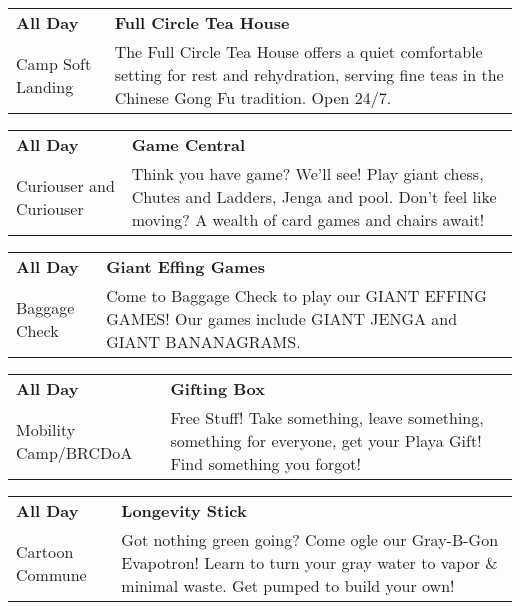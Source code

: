 \begin{tabular}{ p{1in} p{2.2in} }
    \textbf{All Day} & \textbf{Full Circle Tea House} \\
    Camp Soft Landing \newline  & The Full Circle Tea House offers a quiet comfortable setting for rest and rehydration, serving fine teas in the Chinese Gong Fu tradition. Open 24/7. \\
    \hline 
\end{tabular}
    
\begin{tabular}{ p{1in} p{2.2in} }
    \textbf{All Day} & \textbf{Game Central} \\
    Curiouser and Curiouser \newline  & Think you have game? We'll see! Play giant chess, Chutes and Ladders, Jenga and pool. Don't feel like moving? A wealth of card games and chairs await! \\
    \hline 
\end{tabular}
    
\begin{tabular}{ p{1in} p{2.2in} }
    \textbf{All Day} & \textbf{Giant Effing Games} \\
    Baggage Check \newline  & Come to Baggage Check to play our GIANT EFFING GAMES! Our games include GIANT JENGA and GIANT BANANAGRAMS. \\
    \hline 
\end{tabular}
    
\begin{tabular}{ p{1in} p{2.2in} }
    \textbf{All Day} & \textbf{Gifting Box} \\
    Mobility Camp/BRCDoA \newline  & Free Stuff! Take something, leave something, something for everyone, get your Playa Gift! Find something you forgot! \\
    \hline 
\end{tabular}
    
\begin{tabular}{ p{1in} p{2.2in} }
    \textbf{All Day} & \textbf{Longevity Stick} \\
    Cartoon Commune \newline  & Got nothing green going? Come ogle our Gray-B-Gon Evapotron! Learn to turn your gray water to vapor \& minimal waste. Get pumped to build your own! \\
    \hline 
\end{tabular}
    
